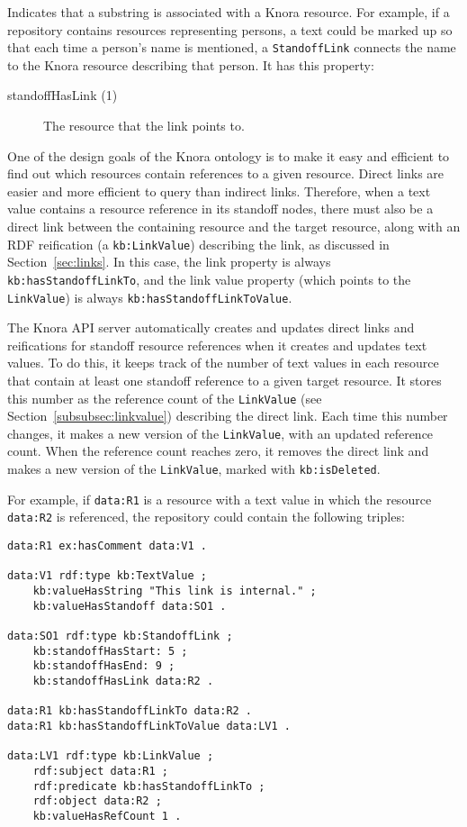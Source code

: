 \documentclass[12pt, a4paper]{article}
\begin{document}
\label{subsubsec:standoff-link}

Indicates that a substring is associated with a Knora resource. For example, if a repository contains resources representing persons, a text could be marked up so that each time a person's name is mentioned, a \texttt{StandoffLink} connects the name to the Knora resource describing that person. It has this property:

\begin{description}
	\item[standoffHasLink (1)] The resource that the link points to.
\end{description}

One of the design goals of the Knora ontology is to make it easy and efficient to find out which resources contain references to a given resource. Direct links are easier and more efficient to query than indirect links. Therefore, when a text value contains a resource reference in its standoff nodes, there must also be a direct link between the containing resource and the target resource, along with an RDF reification (a \texttt{kb:LinkValue}) describing the link, as discussed in Section~\ref{sec:links}. In this case, the link property is always \texttt{kb:hasStandoffLinkTo}, and the link value property (which points to the \texttt{LinkValue}) is always \texttt{kb:hasStandoffLinkToValue}.

The Knora API server automatically creates and updates direct links and reifications for standoff resource references when it creates and updates text values. To do this, it keeps track of the number of text values in each resource that contain at least one standoff reference to a given target resource. It stores this number as the reference count of the \texttt{LinkValue} (see Section~\ref{subsubsec:linkvalue}) describing the direct link. Each time this number changes, it makes a new version of the \texttt{LinkValue}, with an updated reference count. When the reference count reaches zero, it removes the direct link and makes a new version of the \texttt{LinkValue}, marked with \texttt{kb:isDeleted}.

For example, if \texttt{data:R1} is a resource with a text value in which the resource \texttt{data:R2} is referenced, the repository could contain the following triples:

\begin{verbatim}
data:R1 ex:hasComment data:V1 .

data:V1 rdf:type kb:TextValue ;
    kb:valueHasString "This link is internal." ;
    kb:valueHasStandoff data:SO1 .

data:SO1 rdf:type kb:StandoffLink ;
    kb:standoffHasStart: 5 ;
    kb:standoffHasEnd: 9 ;
    kb:standoffHasLink data:R2 .

data:R1 kb:hasStandoffLinkTo data:R2 .
data:R1 kb:hasStandoffLinkToValue data:LV1 . 

data:LV1 rdf:type kb:LinkValue ;            
    rdf:subject data:R1 ;
    rdf:predicate kb:hasStandoffLinkTo ;
    rdf:object data:R2 ;
    kb:valueHasRefCount 1 .
\end{verbatim}
\end{document}
